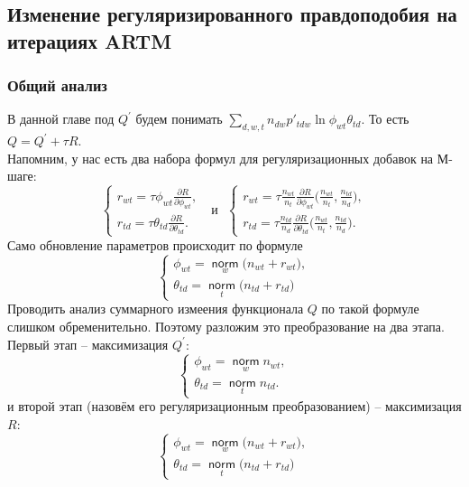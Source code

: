 \documentclass[12pt]{article}
\newcommand{\norm}{\mathop{\mathsf{norm}}\limits}
\begin{document}
	\subsection{Изменение регуляризированного правдоподобия на итерациях ARTM}
	\subsubsection{Общий анализ}
В данной главе под $Q^{\prime}$ будем понимать $\sum\limits_{d, w, t} n_{dw} p'_{tdw} \ln{\phi_{wt}\theta_{td}}$. То есть $Q = Q^{\prime} + \tau R$.\\
Напомним, у нас есть два набора формул для регуляризационных добавок на М-шаге:
\[
\left\{
	\begin{aligned}
		r_{wt}= \tau\phi_{wt} \frac{\partial{R}}{\partial{\phi_{wt}}},\\
		r_{td} = \tau\theta_{td} \frac{\partial{R}}{\partial{\theta_{td}}}.
	\end{aligned}
\right.
\text{~~и~~}
\left\{
	\begin{aligned}
		r_{wt} = \tau \frac{n_{wt}}{n_t} \frac{\partial{R}}{\partial{\phi_{wt}}} \biggl(\frac{n_{wt}}{n_t}, \frac{n_{td}}{n_d}\biggr),\\
		r_{td}= \tau \frac{n_{td}}{n_d} \frac{\partial{R}}{\partial{\theta_{td}}} \biggl(\frac{n_{wt}}{n_t}, \frac{n_{td}}{n_d}\biggr).
	\end{aligned}
\right.
\]
Само обновление параметров происходит по формуле 
\[
\left\{
\begin{aligned}
 \phi_{wt}  = \norm_w \bigl(n_{wt} + r_{wt} \bigr),\\
\theta_{td} = \norm_t  \bigl(n_{td} + r_{td}\bigr)
\end{aligned}
\right.
\]
Проводить анализ суммарного измеения функционала $Q$ по такой формуле слишком обременительно. Поэтому  разложим это преобразование на два этапа. Первый этап -- максимизация $Q^{\prime}$:
\[
\left\{
	\begin{aligned}
		\phi_{wt} = \norm_w  n_{wt},\\
		\theta_{td} = \norm_t n_{td} .
	\end{aligned}
\right.
\]
и второй этап (назовём его регуляризационным преобразованием) -- максимизация $R$:
\[
\left\{
\begin{aligned}
 \phi_{wt}  = \norm_w \bigl(n_{wt} + r_{wt} \bigr),\\
\theta_{td} = \norm_t  \bigl(n_{td} + r_{td}\bigr)
\end{aligned}
\right.
\]
\end{document}
